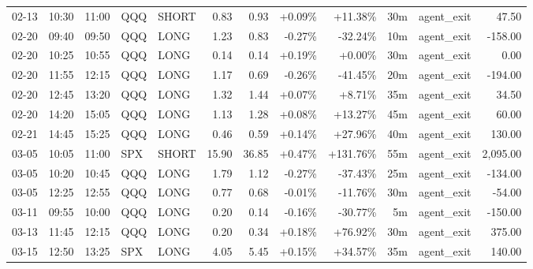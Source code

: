 \documentclass[11pt,a4paper,twoside]{article}
\begin{document}
\begin{center}
\begin{longtable}{>{\color{txtmain}}l l l l l r r r r r >{\color{txtmain}}l r}
02-13 & 10:30 & 11:00 & QQQ & SHORT & 0.83 & 0.93 & \textcolor{wingreen}{+0.09\%} & \textcolor{wingreen}{+11.38\%} & 30m & agent\_exit & \textcolor{wingreen}{47.50} \\
02-20 & 09:40 & 09:50 & QQQ & LONG & 1.23 & 0.83 & \textcolor{lossred}{-0.27\%} & \textcolor{lossred}{-32.24\%} & 10m & agent\_exit & \textcolor{lossred}{-158.00} \\
02-20 & 10:25 & 10:55 & QQQ & LONG & 0.14 & 0.14 & \textcolor{wingreen}{+0.19\%} & \textcolor{wingreen}{+0.00\%} & 30m & agent\_exit & \textcolor{wingreen}{0.00} \\
02-20 & 11:55 & 12:15 & QQQ & LONG & 1.17 & 0.69 & \textcolor{lossred}{-0.26\%} & \textcolor{lossred}{-41.45\%} & 20m & agent\_exit & \textcolor{lossred}{-194.00} \\
02-20 & 12:45 & 13:20 & QQQ & LONG & 1.32 & 1.44 & \textcolor{wingreen}{+0.07\%} & \textcolor{wingreen}{+8.71\%} & 35m & agent\_exit & \textcolor{wingreen}{34.50} \\
02-20 & 14:20 & 15:05 & QQQ & LONG & 1.13 & 1.28 & \textcolor{wingreen}{+0.08\%} & \textcolor{wingreen}{+13.27\%} & 45m & agent\_exit & \textcolor{wingreen}{60.00} \\
02-21 & 14:45 & 15:25 & QQQ & LONG & 0.46 & 0.59 & \textcolor{wingreen}{+0.14\%} & \textcolor{wingreen}{+27.96\%} & 40m & agent\_exit & \textcolor{wingreen}{130.00} \\
03-05 & 10:05 & 11:00 & SPX & SHORT & 15.90 & 36.85 & \textcolor{wingreen}{+0.47\%} & \textcolor{wingreen}{+131.76\%} & 55m & agent\_exit & \textcolor{wingreen}{2,095.00} \\
03-05 & 10:20 & 10:45 & QQQ & LONG & 1.79 & 1.12 & \textcolor{lossred}{-0.27\%} & \textcolor{lossred}{-37.43\%} & 25m & agent\_exit & \textcolor{lossred}{-134.00} \\
03-05 & 12:25 & 12:55 & QQQ & LONG & 0.77 & 0.68 & \textcolor{lossred}{-0.01\%} & \textcolor{lossred}{-11.76\%} & 30m & agent\_exit & \textcolor{lossred}{-54.00} \\
03-11 & 09:55 & 10:00 & QQQ & LONG & 0.20 & 0.14 & \textcolor{lossred}{-0.16\%} & \textcolor{lossred}{-30.77\%} & 5m & agent\_exit & \textcolor{lossred}{-150.00} \\
03-13 & 11:45 & 12:15 & QQQ & LONG & 0.20 & 0.34 & \textcolor{wingreen}{+0.18\%} & \textcolor{wingreen}{+76.92\%} & 30m & agent\_exit & \textcolor{wingreen}{375.00} \\
03-15 & 12:50 & 13:25 & SPX & LONG & 4.05 & 5.45 & \textcolor{wingreen}{+0.15\%} & \textcolor{wingreen}{+34.57\%} & 35m & agent\_exit & \textcolor{wingreen}{140.00} \\

\end{longtable}
\end{center}
\end{document}
